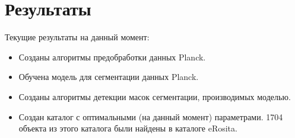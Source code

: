 \chapter{Результаты}
\label{cha:ch_4}
Текущие результаты на данный момент:\\
\begin{itemize}
    \item Созданы алгоритмы предобработки данных Planck.\\
    \item Обучена модель для сегментации данных Planck.\\
    \item Созданы алгоритмы детекции масок сегментации, производимых моделью.\\
    \item Создан каталог с оптимальными (на данный момент) параметрами. 1704 объекта из этого 
        каталога были найдены в каталоге eRosita.\\
\end{itemize}
